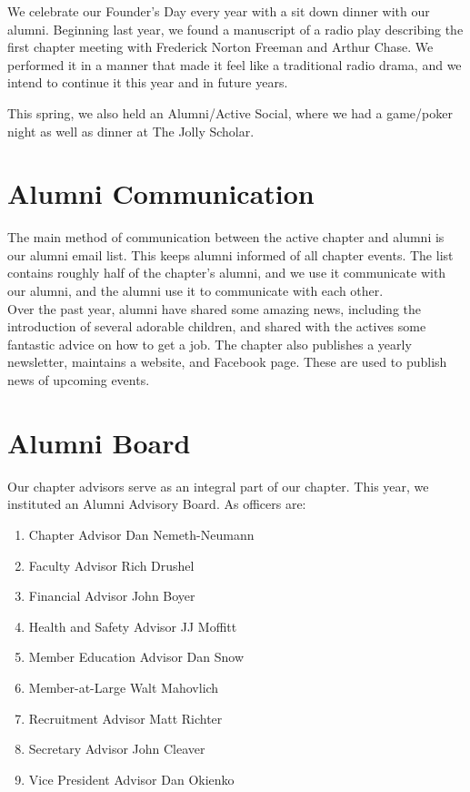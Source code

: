     We celebrate our Founder’s Day every year with a sit down dinner with our alumni. Beginning last year, we found a manuscript of a radio play describing the first chapter meeting with Frederick Norton Freeman and Arthur Chase. We performed it in a manner that made it feel like a traditional radio drama, and we intend to continue it this year and in future years.
    
    This spring, we also held an Alumni/Active Social, where we had a game/poker night as well as dinner at The Jolly Scholar.
    
  \section*{Alumni Communication}
    The main method of communication between the active chapter and alumni is our alumni email list. This keeps alumni informed of all chapter events. The list contains roughly half of the chapter’s alumni, and we use it communicate with our alumni, and the alumni use it to communicate with each other. \\

    Over the past year, alumni have shared some amazing news, including the introduction of several adorable children, and shared with the actives some fantastic advice on how to get a job. The chapter also publishes a yearly newsletter, maintains a website, and Facebook page. These are used to publish news of upcoming events.
    
  \section*{Alumni Board}
    Our chapter advisors serve as an integral part of our chapter. This year, we instituted an Alumni Advisory Board. As officers are:
      \begin{enumerate}
       \item Chapter Advisor Dan Nemeth-Neumann
       \item Faculty Advisor Rich Drushel
       \item Financial Advisor John Boyer
       \item Health and Safety Advisor JJ Moffitt
       \item Member Education Advisor Dan Snow
       \item Member-at-Large Walt Mahovlich
       \item Recruitment Advisor Matt Richter
       \item Secretary Advisor John Cleaver
       \item Vice President Advisor Dan Okienko
      \end{enumerate}

